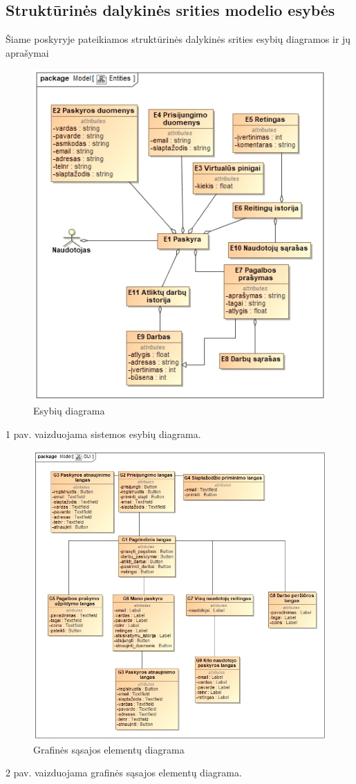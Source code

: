 \documentclass{VUMIFPSbakalaurinis}
\begin{document}
\subsection {Struktūrinės dalykinės srities modelio esybės}
Šiame poskyryje pateikiamos struktūrinės dalykinės srities esybių diagramos ir jų aprašymai
\begin{figure}[H]
	\centering
	\includegraphics[scale=0.7]{img/Entities}
	\caption{Esybių diagrama}
	\label{img:entities}
\end{figure}
1 pav. vaizduojama sistemos esybių diagrama.

\begin{figure}[H]
	\centering
	\includegraphics[scale=0.7]{img/GUI}
	\caption{Grafinės sąsajos elementų diagrama}
	\label{img:gui}
\end{figure}
2 pav. vaizduojama grafinės sąsajos elementų diagrama. 
\end{document}
